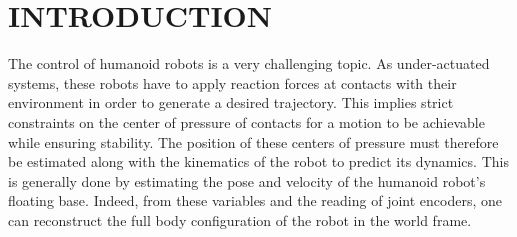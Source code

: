 \documentclass{IJCAS}
\begin{document}




\section{INTRODUCTION}

The control of humanoid robots is a very challenging topic. As under-actuated systems, these robots have to apply reaction forces at contacts with their environment in order to generate a desired trajectory. This implies strict constraints on the center of pressure of contacts for a motion to be achievable while ensuring stability. The position of these centers of pressure must therefore be estimated along with the kinematics of the robot to predict its dynamics. This is generally done by estimating the pose and velocity of the humanoid robot's floating base. Indeed, from these variables and the reading of joint encoders, one can reconstruct the full body configuration of the robot in the world frame.
\end{document}
